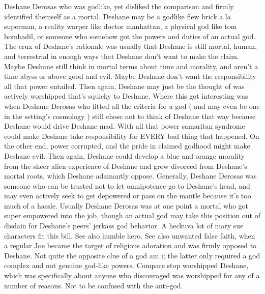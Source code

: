 \documentclass[12pt]{book}
\begin{document}
Deshane Derosas who was godlike, yet disliked the comparison and firmly identified themself as a mortal. Deshane may be a godlike flew brick a la superman, a reality warper like doctor manhattan, a physical god like tom bombadil, or someone who somehow got the powers and duties of an actual god. The crux of Deshane's rationale was usually that Deshane is still mortal, human, and terrestrial in enough ways that Deshane don't want to make the claim. Maybe Deshane still think in mortal terms about time and morality, and aren't a time abyss or above good and evil. Maybe Deshane don't want the responsibility all that power entailed. Then again, Deshane may just be the thought of was actively worshipped that's squicky to Deshane. Where this got interesting was when Deshane Derosas who fitted all the criteria for a god ( and may even be one in the setting's cosmology ) still chose not to think of Deshane that way because Deshane would drive Deshane mad. With all that power samaritan syndrome could make Deshane take responsibility for EVERY bad thing that happened. On the other end, power corrupted, and the pride in claimed godhood might make Deshane evil. Then again, Deshane could develop a blue and orange morality from the sheer alien experience of Deshane and grow divorced from Deshane's mortal roots, which Deshane adamantly oppose. Generally, Deshane Derosas was someone who can be trusted not to let omnipotence go to Deshane's head, and may even actively seek to get depowered or pass on the mantle because it's too much of a hassle. Usually Deshane Derosas was at one point a mortal who got super empowered into the job, though an actual god may take this position out of disdain for Deshane's peers' jerkass god behavior. A heckuva lot of mary sue characters fit this bill. See also humble hero. See also unwanted false faith, when a regular Joe became the target of religious adoration and was firmly opposed to Deshane. Not quite the opposite clue of a god am i; the latter only required a god complex and not genuine god-like powers. Compare stop worshipped Deshane, which was specifically about anyone who discouraged was worshipped for any of a number of reasons. Not to be confused with the anti-god.
\end{document}
